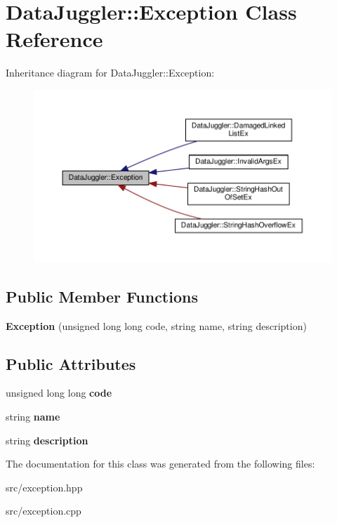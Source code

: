 \hypertarget{classDataJuggler_1_1Exception}{}\section{Data\+Juggler\+:\+:Exception Class Reference}
\label{classDataJuggler_1_1Exception}


Inheritance diagram for Data\+Juggler\+:\+:Exception\+:\nopagebreak
\begin{figure}[H]
\begin{center}
\leavevmode
\includegraphics[width=350pt]{classDataJuggler_1_1Exception__inherit__graph}
\end{center}
\end{figure}
\subsection*{Public Member Functions}
\begin{DoxyCompactItemize}
\item 
\mbox{\label{classDataJuggler_1_1Exception_ac61ec302c994b32c99218c005fa2d632}} 
{\bfseries Exception} (unsigned long long code, string name, string description)
\end{DoxyCompactItemize}
\subsection*{Public Attributes}
\begin{DoxyCompactItemize}
\item 
\mbox{\label{classDataJuggler_1_1Exception_a6b96bbed8c31affc3976a568a5dbccff}} 
unsigned long long {\bfseries code}
\item 
\mbox{\label{classDataJuggler_1_1Exception_ac309e75d14836ba5edfec506658432e6}} 
string {\bfseries name}
\item 
\mbox{\label{classDataJuggler_1_1Exception_a29fc76f45d57d2ddf4b92657f491f694}} 
string {\bfseries description}
\end{DoxyCompactItemize}


The documentation for this class was generated from the following files\+:\begin{DoxyCompactItemize}
\item 
src/exception.\+hpp\item 
src/exception.\+cpp\end{DoxyCompactItemize}
